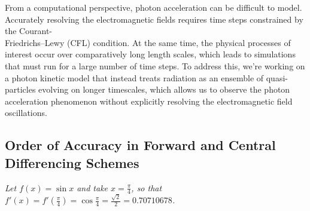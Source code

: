 From a computational perspective, photon acceleration can be difficult to model. Accurately resolving the electromagnetic fields requires time steps constrained by the Courant-\\Friedrichs–Lewy (CFL) condition. At the same time, the physical processes of interest occur over comparatively long length scales, which leads to simulations that must run for a large number of time steps. To address this, we're working on a photon kinetic model that instead treats radiation as an ensemble of quasi-particles evolving on longer timescales, which allows us to observe the photon acceleration phenomenon without explicitly resolving the electromagnetic field oscillations.

\subsection{Order of Accuracy in Forward and Central Differencing Schemes}
\textit{Let $f(x) = \sin{x}$ and take $x = \frac{\pi}{4}$, so that $f'(x) = f'(\frac{\pi}{4}) = \cos{\frac{\pi}{4}} = \frac{\sqrt{2}}{2} = 0.70710678$.}

